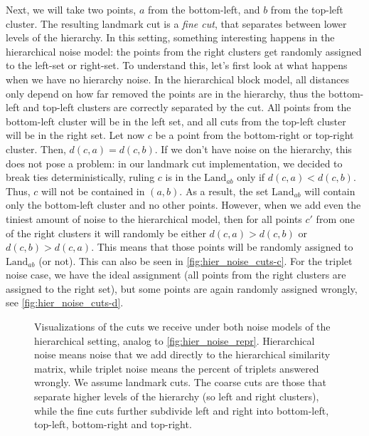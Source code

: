 Next, we will take two points, $a$ from the bottom-left, and $b$ from the top-left cluster. The resulting landmark cut is a \textit{fine cut}, that separates between lower levels of the hierarchy.
In this setting, something interesting happens in the hierarchical noise model: the points from the right clusters get randomly assigned to the left-set or right-set. 
To understand this, let's first look at what happens when we have no hierarchy noise. 
In the hierarchical block model, all distances only depend on how far removed the points are in the hierarchy, 
thus the bottom-left and top-left clusters are correctly separated by the cut. All points from
the bottom-left cluster will be in the left set, and all cuts from the top-left cluster will be in the right set.
Let now $c$ be a point from the bottom-right or top-right cluster. Then, $d(c,a) = d(c,b)$. 
If we don't have noise on the hierarchy, this does not pose a problem: in our landmark cut implementation, we decided to break ties deterministically, ruling $c$ is in the 
$\text{Land}_{ab}$ only if $d(c,a) < d(c,b)$. Thus, $c$ will not be contained in $(a,b)$. As a result, the set $\text{Land}_{ab}$ will contain 
only the bottom-left cluster and no other points.
However, when we add even the tiniest amount of noise to the hierarchical model, then for all points $c'$ from one of the right clusters 
it will randomly be either $d(c,a) > d(c,b)$ or $d(c,b) > d(c,a)$. This means that those points will be randomly assigned to $\text{Land}_{ab}$ (or not).
This can also be seen in \autoref{fig:hier_noise_cuts-c}. For the triplet noise case, we have the ideal assignment (all points from the right clusters are assigned to the right set), 
but some points are again randomly assigned wrongly, see \autoref{fig:hier_noise_cuts-d}.

\begin{figure}[ht]
    \centering
    \hfill
    \caption{
        Visualizations of the cuts we receive under both noise models of the hierarchical setting, analog to \autoref{fig:hier_noise_repr}.
        Hierarchical noise means noise that we add directly to the hierarchical similarity matrix, while triplet noise means the 
        percent of triplets answered wrongly. We assume landmark cuts. The coarse cuts are those that separate higher levels of the hierarchy (so left and right clusters), while
        the fine cuts further subdivide left and right into bottom-left, top-left, bottom-right and top-right.
    }
    \label{fig:hier_noise_cuts}
\end{figure}


